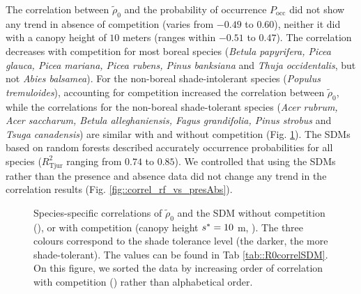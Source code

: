 The correlation between $ \tilde \rho_0 $ and the probability of occurrence $ P_{\text{occ}} $ did not show any trend in absence of competition (varies from $ - 0.49 $ to $ 0.60 $), neither it did with a canopy height of $ 10 $ meters (ranges within $ - 0.51 $ to $ 0.47 $). The correlation decreases with competition for most boreal species (\textit{Betula papyrifera, Picea glauca, Picea mariana, Picea rubens, Pinus banksiana} and \textit{Thuja occidentalis}, but not \textit{Abies balsamea}). For the non-boreal shade-intolerant species (\textit{Populus tremuloides}), accounting for competition increased the correlation between $ \tilde \rho_0 $, while the correlations for the non-boreal shade-tolerant species (\textit{Acer rubrum, Acer saccharum, Betula alleghaniensis, Fagus grandifolia, Pinus strobus} and \textit{Tsuga canadensis}) are similar with and without competition (Fig. \ref{fig::3correls}). The SDMs based on random forests described accurately occurrence probabilities for all species ($ R_{\text{Tjur}}^2 $ ranging from $ 0.74 $ to $ 0.85 $). We controlled that using the SDMs rather than the presence and absence data did not change any trend in the correlation results (Fig. \ref{fig::correl_rf_vs_presAbs}).
\begin{figure}
	\centering
	
	\caption{Species-specific correlations of $ \tilde \rho_0 $ and the SDM without competition (\MoveUp), or with competition (canopy height $ {s}^{*} = 10 $ m, \CircSteel). The three colours correspond to the shade tolerance level (the darker, the more shade-tolerant). The values can be found in Tab \ref{tab::R0correlSDM}. On this figure, we sorted the data by increasing order of correlation with competition (\CircSteel) rather than alphabetical order. \label{fig::3correls}}
\end{figure}
